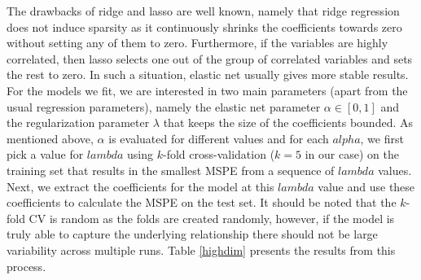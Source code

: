 \documentclass[paper=a4, fontsize=11pt]{scrartcl} %
\numberwithin{equation}{section} %
\begin{document}
The drawbacks of ridge and lasso are well known, namely that ridge regression does not induce sparsity as it continuously shrinks the coefficients towards zero without setting any of them to zero. Furthermore, if the variables are highly correlated, then lasso selects one out of the group of correlated variables and sets the rest to zero. In such a situation, elastic net usually gives more stable results.\\

For the models we fit, we are interested in two main parameters (apart from the usual regression parameters), namely the elastic net parameter $\alpha \in [0,1]$ and the regularization parameter $\lambda$ that keeps the size of the coefficients bounded. As mentioned above, $\alpha$ is evaluated for different values and for each $alpha$, we first pick a value for $lambda$ using $k$-fold cross-validation ($k=5$ in our case) on the training set that results in the smallest MSPE from a sequence of $lambda$ values. Next, we extract the coefficients for the model at this $lambda$ value and use these coefficients to calculate the MSPE on the test set. It should be noted that the $k$-fold CV is random as the folds are created randomly, however, if the model is truly able to capture the underlying relationship there should not be large variability across multiple runs. Table \ref{highdim} presents the results from this process.\\
\end{document}
